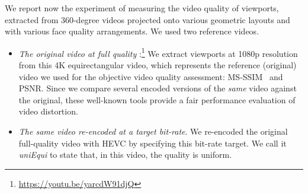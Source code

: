 We report now the experiment of measuring the video quality of
viewports, extracted from 360-degree videos
projected onto various geometric layouts and with various face quality
arrangements. We used two reference videos.
\begin{itemize}%

   \item \emph{The original video at full quality}%
   :\footnote{\url{https://youtu.be/yarcdW91djQ}}
	We extract viewports at 1080p resolution from this 4K
   equirectangular video, which represents the reference (original)
   video we used for the objective video quality assessment:
   \ac{MS-SSIM}~\cite{wang2003multiscale} and
   \ac{PSNR}.
   Since we
   compare several encoded versions of the \emph{same} video against the
   original, these well-known tools provide a fair performance evaluation of video distortion.

   \item \emph{The same video re-encoded at a target bit-rate}.
   We re-encoded the original full-quality video with \ac{HEVC}
   by specifying this bit-rate target. We call it \emph{uniEqui} to
   state that, in this video, the quality is uniform.
\end{itemize}


